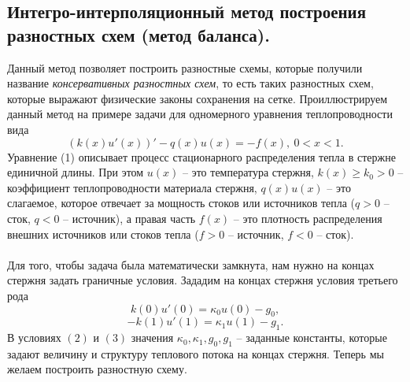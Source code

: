 \documentclass[a4paper, 12pt]{report}
\numberwithin{equation}{section}
\renewcommand{\geq}{\geqslant}
\begin{document}
	\subsection{Интегро-интерполяционный метод построения разностных схем (метод баланса).}
	Данный метод позволяет построить разностные схемы, которые получили название \textit{консервативных разностных схем}, то есть таких разностных схем, которые выражают физические законы сохранения на сетке. Проиллюстрируем данный метод на примере задачи для одномерного уравнения теплопроводности вида
	\begin{equation}
		(k(x) u'(x))' - q(x)u(x) = -f(x), \ 0<x<1.
	\end{equation}
	Уравнение (1) описывает процесс стационарного распределения тепла в стержне единичной длины.
	При этом $u(x)$ -- это температура стержня, $k(x)\geq k_0 > 0$ -- коэффициент теплопроводности материала стержня, $q(x)u(x)$ -- это слагаемое, которое отвечает за мощность стоков или источников тепла ($q>0$ -- сток, $q<0$ -- источник), а правая часть $f(x)$ -- это плотность распределения внешних источников или стоков тепла ($f>0$ -- источник, $f<0$ -- сток). \\\\
	Для того, чтобы задача была математически замкнута, нам нужно на концах стержня задать граничные условия. Зададим на концах стержня условия третьего рода
	\begin{equation}
		k(0) u'(0) = \kappa_0 u(0) - g_0,
	\end{equation}
	\begin{equation}
		- k(1) u'(1) = \kappa_1 u(1) - g_1.
	\end{equation}
	В условиях $(2)$ и $(3)$ значения $\kappa_0, \kappa_1, g_0, g_1$ -- заданные константы, которые задают величину и структуру теплового потока на концах стержня.
	Теперь мы желаем построить разностную схему. 
\end{document}
